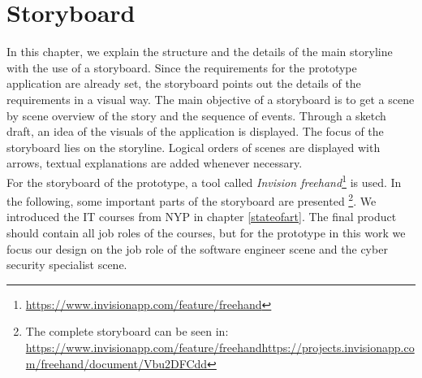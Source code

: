 \section{Storyboard}
In this chapter, we explain the structure and the details of the main storyline with the use of a storyboard. Since the requirements for the prototype application are already set, the storyboard points out the details of the requirements in a visual way.
The main objective of a storyboard is to get a scene by scene overview of the story and the sequence of events. Through a sketch draft, an idea of the visuals of the application is displayed. The focus of the storyboard lies on the storyline. Logical orders of scenes are displayed with arrows, textual explanations are added whenever necessary.\\
For the storyboard of the prototype, a tool called \textit{Invision freehand}\footnote{\label{foot:2} \url{https://www.invisionapp.com/feature/freehand}} is used. In the following, some important parts of the storyboard are presented \footnote{\label{foot:3} The complete storyboard can be seen in: \url{https://www.invisionapp.com/feature/freehandhttps://projects.invisionapp.com/freehand/document/Vbu2DFCdd}}. We introduced the IT courses from NYP in chapter
\ref{stateofart}. The final product should contain all job roles of the courses, but for the prototype in this work we focus our design on the job role of the software engineer scene and the cyber security specialist scene.
